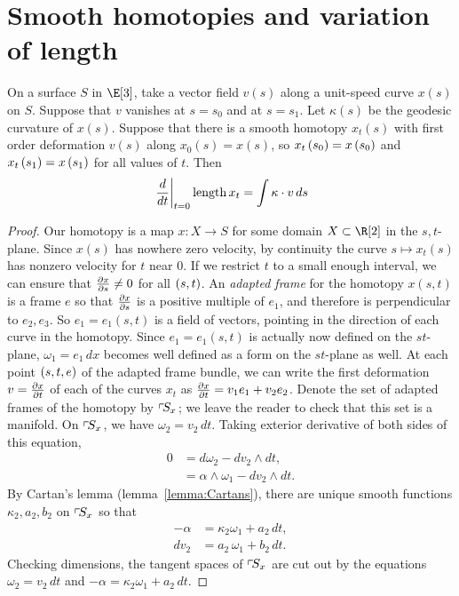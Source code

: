\section{Smooth homotopies and variation of length}
\begin{lemma}
On a surface \(S\) in \(\E[3]\), take a vector field \(v(s)\) along a unit-speed curve \(x(s)\) on \(S\).
Suppose that \(v\) vanishes at \(s=s_0\) and at \(s=s_1\).
Let \(\kappa(s)\) be the geodesic curvature of \(x(s)\).
Suppose that there is a smooth homotopy \(x_t(s)\) with first order deformation \(v(s)\) along \(x_0(s)=x(s)\), so \(x_t\pr{s_0}=x\pr{s_0}\) and \(x_t\pr{s_1}=x\pr{s_1}\) for all values of \(t\).
Then 
\[
\left.\frac{d}{dt}\right|_{t=0} \length{x_t} = \int \kappa \cdot v \, ds
\]
\end{lemma}
\begin{proof}
Our homotopy is a map \(x \colon X \to S\) for some domain \(X \subset \R[2]\) in the \(s,t\)-plane.
Since \(x(s)\) has nowhere zero velocity, by continuity the curve \(s \mapsto x_t(s)\) has nonzero velocity for \(t\) near 0.
If we restrict \(t\) to a small enough interval, we can ensure that \(\pderiv{x}{s}\ne 0\) for all \(\pr{s,t}\).
An \emph{adapted frame}%
for the homotopy \(x(s,t)\) is a frame \(e\) so that \(\pderiv{x}{s}\) is a positive multiple of \(e_1\), and therefore is perpendicular to \(e_2, e_3\).
So \(e_1=e_1(s,t)\) is a field of vectors, pointing in the direction of each curve in the homotopy.
Since \(e_1=e_1(s,t)\) is actually now defined on the \(st\)-plane, \(\omega_1=e_1 \, dx\) becomes well defined as a form on the \(st\)-plane as well.
At each point \(\pr{s,t,e}\) of the adapted frame bundle, we can write the first deformation \(v=\pderiv{x}{t}\) of each of the curves \(x_t\) as \(\pderiv{x}{t}=v_1 e_1 + v_2 e_2\).
Denote the set of adapted frames of the homotopy by \(\adaptedFrameBundle{x}{S}\); we leave the reader to check that this set is a manifold.
On \(\adaptedFrameBundle{x}{S}\), we have \(\omega_2=v_2 \, dt\).
Taking exterior derivative of both sides of this equation,
\begin{align*}
0 
&=
d\omega_2 - dv_2 \wedge dt,
\\
&=
\alpha \wedge \omega_1 - dv_2 \wedge dt.
\end{align*}
By Cartan's lemma (lemma~\vref{lemma:Cartans}), there are unique smooth functions \(\kappa_2, a_2, b_2\) on \(\adaptedFrameBundle{x}{S}\) so that
\begin{align*}
-\alpha &= \kappa_2 \omega_1 + a_2 \, dt, \\
dv_2    &= a_2 \, \omega_1 + b_2 \, dt.
\end{align*}
Checking dimensions, the tangent spaces of \(\adaptedFrameBundle{x}{S}\) are cut out by the equations \(\omega_2=v_2 \, dt\) and \(-\alpha=\kappa_2 \omega_1 + a_2 \, dt\).


\end{proof}
